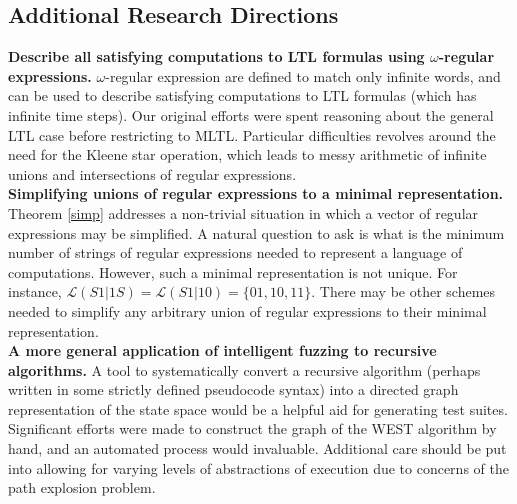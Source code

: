 \documentclass[runningheads]{llncs}
\begin{document}
\subsection{Additional Research Directions}
\textbf{Describe all satisfying computations to LTL formulas using $\omega$-regular expressions.}
$\omega$-regular expression are defined to match only infinite words, and can be used to describe satisfying computations to LTL formulas (which has infinite time steps). 
Our original efforts were spent reasoning about the general LTL case before restricting to MLTL. Particular difficulties revolves around the need for the Kleene star operation, which leads to messy arithmetic of infinite unions and intersections of regular expressions. \\
\noindent \textbf{Simplifying unions of regular expressions to a minimal representation.}
Theorem \ref{simp} addresses a non-trivial situation in which a vector of regular expressions may be simplified. A natural question to ask is what is the minimum number of strings of regular expressions needed to represent a language of computations. However, such a minimal representation is not unique. For instance, $\mathscr{L}(S1|1S) = \mathscr{L}(S1|10) = \{01, 10, 11\}$. There may be other schemes needed to simplify any arbitrary union of regular expressions to their minimal representation.\\
\noindent \textbf{A more general application of intelligent fuzzing to recursive algorithms.}
A tool to systematically convert a recursive algorithm (perhaps written in some strictly defined pseudocode syntax) into a directed graph representation of the state space would be a helpful aid for generating test suites. 
Significant efforts were made to construct the graph of the WEST algorithm by hand, and an automated process would invaluable. 
Additional care should be put into allowing for varying levels of abstractions of execution due to concerns of the path explosion problem. 
%
%
%


\newpage
\appendix
\end{document}
